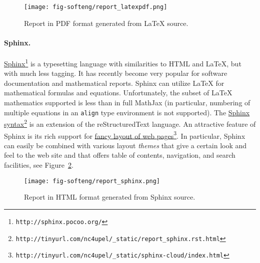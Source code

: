 \documentclass[graybox,sectrefs,envcountresetchap,open=right,final]{svmonodo}
\begin{document}
\begin{figure}[!ht]  %
  \centerline{\texttt{[image: fig-softeng/report\_latexpdf.png]}}
  \caption{
  Report in PDF format generated from {\LaTeX} source. \label{softeng1:exper:report:fig:latex}
  }
\end{figure}


\paragraph{Sphinx.}

\href{{http://sphinx.pocoo.org/}}{Sphinx}\footnote{\texttt{http://sphinx.pocoo.org/}} is a typesetting language with
similarities to HTML and {\LaTeX}, but with much less tagging. It has
recently become very popular for software documentation and
mathematical reports. Sphinx can utilize {\LaTeX} for mathematical
formulas and equations. Unfortunately, the
subset of {\LaTeX} mathematics supported is less than in full MathJax (in
particular, numbering of multiple equations in an \texttt{align} type
environment is not supported).  The \href{{http://tinyurl.com/nc4upel/_static/report_sphinx.rst.html}}{Sphinx syntax}\footnote{\texttt{http://tinyurl.com/nc4upel/\_static/report\_sphinx.rst.html}} is an extension of
the reStructuredText language. An attractive feature of Sphinx is its
rich support for \href{{http://tinyurl.com/nc4upel/_static/sphinx-cloud/index.html}}{fancy layout of web pages}\footnote{\texttt{http://tinyurl.com/nc4upel/\_static/sphinx-cloud/index.html}}. In particular,
Sphinx can easily be combined with various layout \emph{themes} that give a
certain look and feel to the web site and that offers table of
contents, navigation, and search facilities, see Figure~\ref{softeng1:exper:report:fig:sphinx}.

\begin{figure}[!ht]  %
  \centerline{\texttt{[image: fig-softeng/report\_sphinx.png]}}
  \caption{
  Report in HTML format generated from Sphinx source. \label{softeng1:exper:report:fig:sphinx}
  }
\end{figure}

\end{document}
